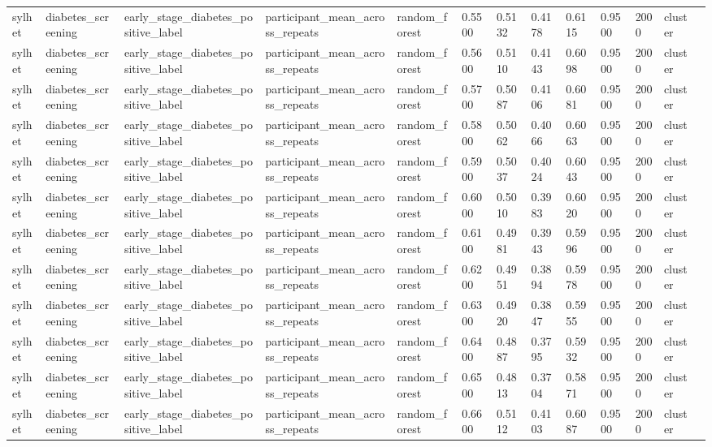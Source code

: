 \begin{tabular}{lllllllllllll}
sylhet & diabetes\_screening & early\_stage\_diabetes\_positive\_label & participant\_mean\_across\_repeats & random\_forest & 0.5500 & 0.5132 & 0.4178 & 0.6115 & 0.9500 & 2000 & cluster &  \\
sylhet & diabetes\_screening & early\_stage\_diabetes\_positive\_label & participant\_mean\_across\_repeats & random\_forest & 0.5600 & 0.5110 & 0.4143 & 0.6098 & 0.9500 & 2000 & cluster &  \\
sylhet & diabetes\_screening & early\_stage\_diabetes\_positive\_label & participant\_mean\_across\_repeats & random\_forest & 0.5700 & 0.5087 & 0.4106 & 0.6081 & 0.9500 & 2000 & cluster &  \\
sylhet & diabetes\_screening & early\_stage\_diabetes\_positive\_label & participant\_mean\_across\_repeats & random\_forest & 0.5800 & 0.5062 & 0.4066 & 0.6063 & 0.9500 & 2000 & cluster &  \\
sylhet & diabetes\_screening & early\_stage\_diabetes\_positive\_label & participant\_mean\_across\_repeats & random\_forest & 0.5900 & 0.5037 & 0.4024 & 0.6043 & 0.9500 & 2000 & cluster &  \\
sylhet & diabetes\_screening & early\_stage\_diabetes\_positive\_label & participant\_mean\_across\_repeats & random\_forest & 0.6000 & 0.5010 & 0.3983 & 0.6020 & 0.9500 & 2000 & cluster &  \\
sylhet & diabetes\_screening & early\_stage\_diabetes\_positive\_label & participant\_mean\_across\_repeats & random\_forest & 0.6100 & 0.4981 & 0.3943 & 0.5996 & 0.9500 & 2000 & cluster &  \\
sylhet & diabetes\_screening & early\_stage\_diabetes\_positive\_label & participant\_mean\_across\_repeats & random\_forest & 0.6200 & 0.4951 & 0.3894 & 0.5978 & 0.9500 & 2000 & cluster &  \\
sylhet & diabetes\_screening & early\_stage\_diabetes\_positive\_label & participant\_mean\_across\_repeats & random\_forest & 0.6300 & 0.4920 & 0.3847 & 0.5955 & 0.9500 & 2000 & cluster &  \\
sylhet & diabetes\_screening & early\_stage\_diabetes\_positive\_label & participant\_mean\_across\_repeats & random\_forest & 0.6400 & 0.4887 & 0.3795 & 0.5932 & 0.9500 & 2000 & cluster &  \\
sylhet & diabetes\_screening & early\_stage\_diabetes\_positive\_label & participant\_mean\_across\_repeats & random\_forest & 0.6500 & 0.4813 & 0.3704 & 0.5871 & 0.9500 & 2000 & cluster &  \\
sylhet & diabetes\_screening & early\_stage\_diabetes\_positive\_label & participant\_mean\_across\_repeats & random\_forest & 0.6600 & 0.5112 & 0.4103 & 0.6087 & 0.9500 & 2000 & cluster &  \\

\end{tabular}
